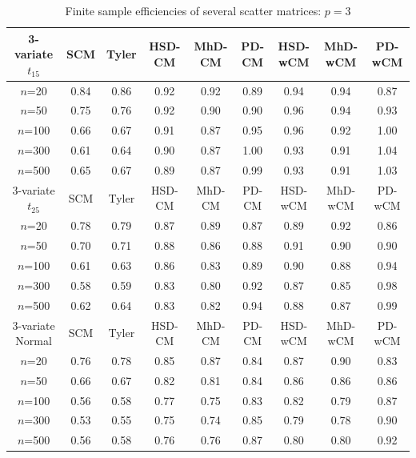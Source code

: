 \documentclass[fleqn,11pt]{article}
\begin{document}
\begin{table}
\begin{footnotesize}
\begin{tabular}{c|cc|ccc|ccc}
    3-variate $t_{15}$ & SCM  & Tyler & HSD-CM & MhD-CM & PD-CM & HSD-wCM & MhD-wCM & PD-wCM \\ \hline
    $n$=20             & 0.84 & 0.86  & 0.92   & 0.92   & 0.89  & 0.94    & 0.94    & 0.87   \\
    $n$=50             & 0.75 & 0.76  & 0.92   & 0.90   & 0.90  & 0.96    & 0.94    & 0.93   \\
    $n$=100            & 0.66 & 0.67  & 0.91   & 0.87   & 0.95  & 0.96    & 0.92    & 1.00   \\
    $n$=300            & 0.61 & 0.64  & 0.90   & 0.87   & 1.00  & 0.93    & 0.91    & 1.04   \\
    $n$=500            & 0.65 & 0.67  & 0.89   & 0.87   & 0.99  & 0.93    & 0.91    & 1.03   \\ \hline
    3-variate $t_{25}$ & SCM  & Tyler & HSD-CM & MhD-CM & PD-CM & HSD-wCM & MhD-wCM & PD-wCM \\ \hline
    $n$=20             & 0.78 & 0.79  & 0.87   & 0.89   & 0.87  & 0.89    & 0.92    & 0.86   \\
    $n$=50             & 0.70 & 0.71  & 0.88   & 0.86   & 0.88  & 0.91    & 0.90    & 0.90   \\
    $n$=100            & 0.61 & 0.63  & 0.86   & 0.83   & 0.89  & 0.90    & 0.88    & 0.94   \\
    $n$=300            & 0.58 & 0.59  & 0.83   & 0.80   & 0.92  & 0.87    & 0.85    & 0.98   \\
    $n$=500            & 0.62 & 0.64  & 0.83   & 0.82   & 0.94  & 0.88    & 0.87    & 0.99   \\ \hline
    3-variate Normal   & SCM  & Tyler & HSD-CM & MhD-CM & PD-CM & HSD-wCM & MhD-wCM & PD-wCM \\ \hline
    $n$=20             & 0.76 & 0.78  & 0.85   & 0.87   & 0.84  & 0.87    & 0.90    & 0.83   \\
    $n$=50             & 0.66 & 0.67  & 0.82   & 0.81   & 0.84  & 0.86    & 0.86    & 0.86   \\
    $n$=100            & 0.56 & 0.58  & 0.77   & 0.75   & 0.83  & 0.82    & 0.79    & 0.87   \\
    $n$=300            & 0.53 & 0.55  & 0.75   & 0.74   & 0.85  & 0.79    & 0.78    & 0.90   \\
    $n$=500            & 0.56 & 0.58  & 0.76   & 0.76   & 0.87  & 0.80    & 0.80    & 0.92   \\ \hline
    \end{tabular}
\end{footnotesize}
\caption{Finite sample efficiencies of several scatter matrices: $p=3$}
\label{table:FSEtable3}
\end{table}
\end{document}
